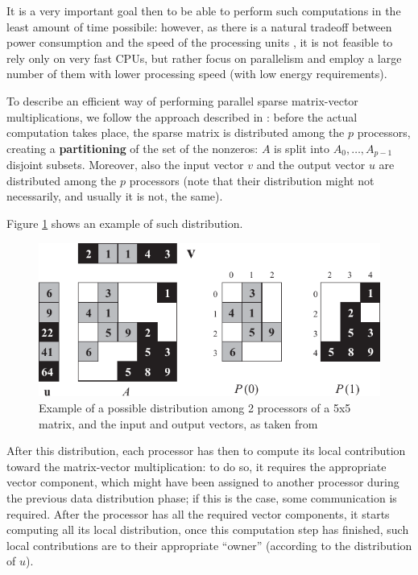 It is a very important goal then to be able to perform such computations in the least amount of time possibile: however, as there is a natural tradeoff between power consumption and the speed of the processing units \cite{rabaey1996digital}, it is not feasible to rely only on very fast CPUs, but rather focus on parallelism and employ a large number of them with lower processing speed (with low energy requirements).

To describe an efficient way of performing parallel sparse matrix-vector multiplications, we follow the approach described in \cite{BSP}: before the actual computation takes place, the sparse matrix is distributed among the $p$ processors, creating a \textbf{partitioning} of the set of the nonzeros: $A$ is split into $A_0,\dots,A_{p-1}$ disjoint subsets. Moreover, also the input vector $v$ and the output vector $u$ are distributed among the $p$ processors (note that their distribution might not necessarily, and usually it is not, the same).

Figure \ref{fig:partition} shows an example of such distribution.

\begin{figure}[h]
	\centering
	\includegraphics{img/partition}
	\caption{Example of a possible distribution among 2 processors of a 5x5 matrix, and the input and output vectors, as taken from \cite[Fig. 4.3]{BSP}}
		\label{fig:partition}
\end{figure}


After this distribution, each processor has then to compute its local contribution toward the matrix-vector multiplication: to do so, it requires the appropriate vector component, which might have been assigned to another processor during the previous data distribution phase; if this is the case, some communication is required. After the processor has all the required vector components, it starts computing all its local distribution, once this computation step has finished, such local contributions are to their appropriate ``owner'' (according to the distribution of $u$).


